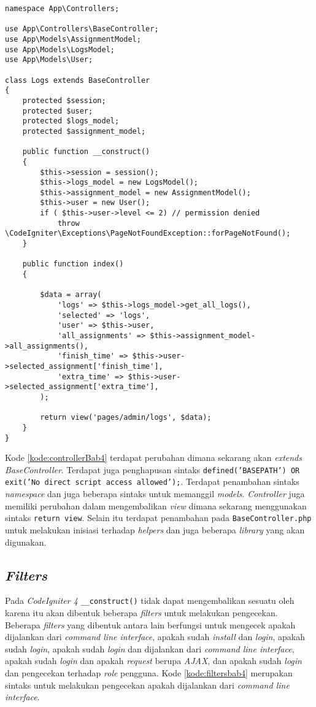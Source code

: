 \begin{lstlisting}[caption=Perubahan kode \textit{controllers} pada \textit{CodeIgniter 4}, label=kode:controllerBab4]
namespace App\Controllers;

use App\Controllers\BaseController;
use App\Models\AssignmentModel;
use App\Models\LogsModel;
use App\Models\User;

class Logs extends BaseController
{
	protected $session;
	protected $user;
	protected $logs_model;
	protected $assignment_model;

	public function __construct()
	{
		$this->session = session();
		$this->logs_model = new LogsModel();
		$this->assignment_model = new AssignmentModel();
		$this->user = new User();
		if ( $this->user->level <= 2) // permission denied
			throw \CodeIgniter\Exceptions\PageNotFoundException::forPageNotFound();
	}
	
	public function index()
	{

		$data = array(
			'logs' => $this->logs_model->get_all_logs(),
			'selected' => 'logs',
			'user' => $this->user,
			'all_assignments' => $this->assignment_model->all_assignments(),
			'finish_time' => $this->user->selected_assignment['finish_time'],
			'extra_time' => $this->user->selected_assignment['extra_time'],
		);

		return view('pages/admin/logs', $data);
	}
}
\end{lstlisting}

Kode \ref{kode:controllerBab4} terdapat perubahan dimana sekarang akan \textit{extends} \textit{BaseController}. Terdapat juga penghapusan sintaks \texttt{defined('BASEPATH') OR exit('No direct script access allowed');}. Terdapat penambahan sintaks \textit{namespace} dan juga beberapa sintaks untuk memanggil \textit{models}. \textit{Controller} juga memiliki perubahan dalam mengembalikan \textit{view} dimana sekarang menggunakan sintaks \texttt{return view}. Selain itu terdapat penambahan pada \texttt{BaseController.php} untuk melakukan inisiasi terhadap \textit{helpers} dan juga beberapa \textit{library} yang akan digunakan.

\subsection{\textit{Filters}}
Pada \textit{CodeIgniter 4} \texttt{\_\_construct()} tidak dapat mengembalikan sesuatu oleh karena itu akan dibentuk beberapa \textit{filters} untuk melakukan pengecekan. Beberapa \textit{filters} yang dibentuk antara lain berfungsi untuk mengecek apakah dijalankan dari \textit{command line interface}, apakah sudah \textit{install} dan \textit{login}, apakah sudah \textit{login}, apakah sudah \textit{login} dan dijalankan dari \textit{command line interface}, apakah sudah \textit{login} dan apakah \textit{request} berupa \textit{AJAX}, dan apakah sudah \textit{login} dan pengecekan terhadap \textit{role} pengguna. Kode \ref{kode:filtersbab4} merupakan sintaks untuk melakukan pengecekan apakah dijalankan dari \textit{command line interface}.

